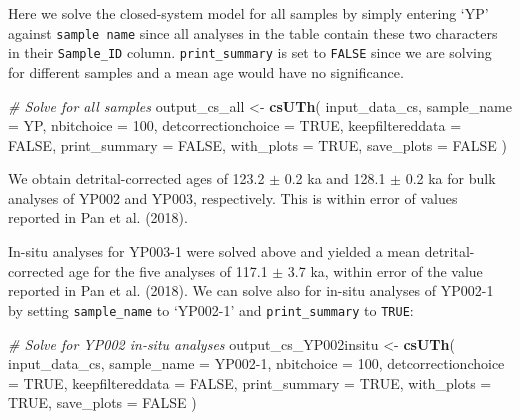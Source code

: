 \documentclass[]{elsarticle} %
\newenvironment{Shaded}{\begin{snugshade}}{\end{snugshade}}
\newcommand{\CommentTok}[1]{\textcolor[rgb]{0.56,0.35,0.01}{\textit{#1}}}
\newcommand{\DataTypeTok}[1]{\textcolor[rgb]{0.13,0.29,0.53}{#1}}
\newcommand{\DecValTok}[1]{\textcolor[rgb]{0.00,0.00,0.81}{#1}}
\newcommand{\KeywordTok}[1]{\textcolor[rgb]{0.13,0.29,0.53}{\textbf{#1}}}
\newcommand{\NormalTok}[1]{#1}
\newcommand{\OtherTok}[1]{\textcolor[rgb]{0.56,0.35,0.01}{#1}}
\newcommand{\StringTok}[1]{\textcolor[rgb]{0.31,0.60,0.02}{#1}}
\begin{document}
Here we solve the closed-system model for all samples by simply entering `YP' against \texttt{sample\ name} since all analyses in the table contain these two characters in their \texttt{Sample\_ID} column. \texttt{print\_summary} is set to \texttt{FALSE} since we are solving for different samples and a mean age would have no significance.

\begin{Shaded}
\begin{Highlighting}[]
\CommentTok{\# Solve for all samples}
\NormalTok{output\_cs\_all \textless{}{-}}
\StringTok{  }\KeywordTok{csUTh}\NormalTok{(}
\NormalTok{    input\_data\_cs,}
    \DataTypeTok{sample\_name =} \StringTok{\textquotesingle{}YP\textquotesingle{}}\NormalTok{,}
    \DataTypeTok{nbitchoice =} \DecValTok{100}\NormalTok{,}
    \DataTypeTok{detcorrectionchoice =} \OtherTok{TRUE}\NormalTok{,}
    \DataTypeTok{keepfiltereddata =} \OtherTok{FALSE}\NormalTok{,}
    \DataTypeTok{print\_summary =} \OtherTok{FALSE}\NormalTok{,}
    \DataTypeTok{with\_plots =} \OtherTok{TRUE}\NormalTok{,}
    \DataTypeTok{save\_plots =} \OtherTok{FALSE}
\NormalTok{  )}
\end{Highlighting}
\end{Shaded}

We obtain detrital-corrected ages of 123.2 \(\pm\) 0.2 ka and 128.1 \(\pm\) 0.2 ka for bulk analyses of YP002 and YP003, respectively. This is within error of values reported in Pan et al. (2018).

In-situ analyses for YP003-1 were solved above and yielded a mean detrital-corrected age for the five analyses of 117.1 \(\pm\) 3.7 ka, within error of the value reported in Pan et al. (2018).
We can solve also for in-situ analyses of YP002-1 by setting \texttt{sample\_name} to `YP002-1' and \texttt{print\_summary} to \texttt{TRUE}:

\begin{Shaded}
\begin{Highlighting}[]
\CommentTok{\# Solve for YP002 in{-}situ analyses}
\NormalTok{output\_cs\_YP002insitu \textless{}{-}}
\StringTok{  }\KeywordTok{csUTh}\NormalTok{(}
\NormalTok{    input\_data\_cs,}
    \DataTypeTok{sample\_name =} \StringTok{\textquotesingle{}YP002{-}1\textquotesingle{}}\NormalTok{,}
    \DataTypeTok{nbitchoice =} \DecValTok{100}\NormalTok{,}
    \DataTypeTok{detcorrectionchoice =} \OtherTok{TRUE}\NormalTok{,}
    \DataTypeTok{keepfiltereddata =} \OtherTok{FALSE}\NormalTok{,}
    \DataTypeTok{print\_summary =} \OtherTok{TRUE}\NormalTok{,}
    \DataTypeTok{with\_plots =} \OtherTok{TRUE}\NormalTok{,}
    \DataTypeTok{save\_plots =} \OtherTok{FALSE}
\NormalTok{  )}
\end{Highlighting}
\end{Shaded}
\end{document}
